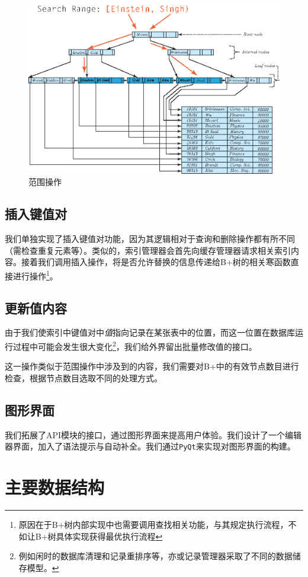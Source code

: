 \documentclass[UTF8]{ctexrep} %
\begin{document}
\begin{figure}[H]
    \centering
    \includegraphics[width=0.75\linewidth]{figure/search_delete_multi.eps}
    \caption{范围操作}
    \label{fig:search_delete_multi}
\end{figure}

\subsection{插入键值对}
我们单独实现了插入键值对功能，因为其逻辑相对于查询和删除操作都有所不同（需检查重复元素等）。类似的，索引管理器会首先向缓存管理器请求相关索引内容。接着我们调用插入操作，将是否允许替换的信息传递给B+树的相关寒函数直接进行操作\footnote{原因在于B+树内部实现中也需要调用查找相关功能，与其规定执行流程，不如让B+树具体实现获得最优执行流程}。

\subsection{更新值内容}
由于我们使索引中键值对中\textit{值}指向记录在某张表中的位置，而这一位置在数据库运行过程中可能会发生很大变化\footnote{例如闲时的数据库清理和记录重排序等，亦或记录管理器采取了不同的数据储存模型。}，我们给外界留出批量修改值的接口。
\par
这一操作类似于范围操作中涉及到的内容，我们需要对B+中的有效节点数目进行检查，根据节点数目选取不同的处理方式。

\subsection{图形界面}
我们拓展了API模块的接口，通过图形界面来提高用户体验。我们设计了一个编辑器界面，加入了语法提示与自动补全。我们通过\texttt{PyQt}来实现对图形界面的构建。

\section{主要数据结构}
\end{document}
